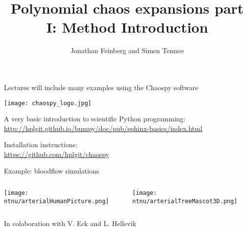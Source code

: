 \documentclass[handout]{beamer}
\title{Polynomial chaos expansions part I: Method Introduction}
\author{Jonathan Feinberg and Simen Tennøe}
\begin{document}
\begin{frame}
  \maketitle
\end{frame}

\begin{frame}[fragile]{Lectures will include many examples using the
    Chaospy software}
  \begin{center}
     \texttt{[image: chaospy\_logo.jpg]}
  \end{center}
    \begin{alert}{A very basic introduction to scientific Python programming:}
    \scriptsize
      \href{http://hplgit.github.io/bumpy/doc/pub/sphinx-basics/index.html}{http://hplgit.github.io/bumpy/doc/pub/sphinx-basics/index.html}\\
  \end{alert}
  \begin{alert}{Installation instructions:}\\
  \scriptsize
      \href{https://github.com/hplgit/chaospy}{https://github.com/hplgit/chaospy}\\
  \end{alert}
% 
\end{frame}

\begin{frame}[fragile]{Example: bloodflow simulations}{}
    \begin{columns}
        \begin{center}
    \texttt{[image: ntnu/arterialHumanPicture.png]}
        \end{center}
        \begin{center}
    \texttt{[image: ntnu/arterialTreeMascot3D.png]}
        \end{center}
    \end{columns}
    \small
    \begin{flushright}
        In colaboration with V. Eck and L. Hellevik
    \end{flushright}
\end{frame}
\end{document}
